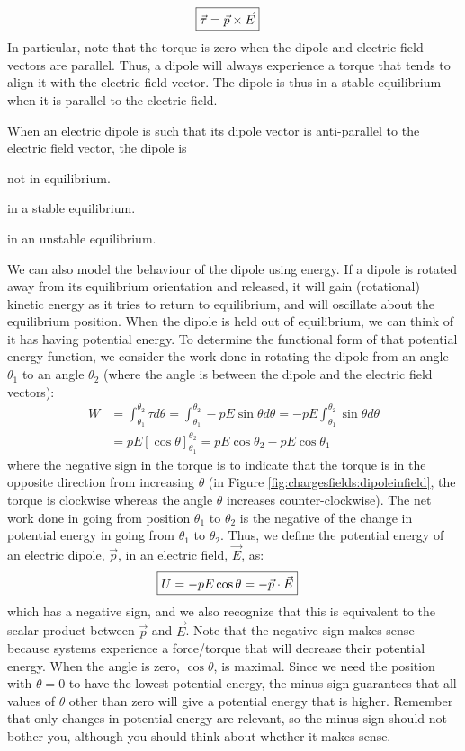 \begin{align*}
\Aboxed{\vec \tau =\vec p \times \vec E}
\end{align*}
In particular, note that the torque is zero when the dipole and electric field vectors are parallel. Thus, a dipole will always experience a torque that tends to align it with the electric field vector. The dipole is thus in a stable equilibrium when it is parallel to the electric field.
\begin{checkpoint}\label{cp:chargesfields:efield}
\begin{MCquestion}{When an electric dipole is such that its dipole vector is anti-parallel to the electric field vector, the dipole is}
\item not in equilibrium.
\item in a stable equilibrium.
\item in an unstable equilibrium. \correct
\end{MCquestion}
\end{checkpoint}

We can also model the behaviour of the dipole using energy. If a dipole is rotated away from its equilibrium orientation and released, it will gain (rotational) kinetic energy as it tries to return to equilibrium, and will oscillate about the equilibrium position. When the dipole is held out of equilibrium, we can think of it has having potential energy. To determine the functional form of that potential energy function, we consider the work done in rotating the dipole from an angle $\theta_1$ to an angle $\theta_2$ (where the angle is between the dipole and the electric field vectors):
\begin{align*}
W&=\int_{\theta_1}^{\theta_2} \tau d\theta=\int_{\theta_1}^{\theta_2} -pE\sin\theta d\theta=-pE\int_{\theta_1}^{\theta_2} \sin\theta d\theta\\
&=pE[\cos\theta]_{\theta_1}^{\theta_2}=pE\cos\theta_2-pE\cos\theta_1
\end{align*}
where the negative sign in the torque is to indicate that the torque is in the opposite direction from increasing $\theta$ (in Figure \ref{fig:chargesfields:dipoleinfield}, the torque is clockwise whereas the angle $\theta$ increases counter-clockwise). The net work done in going from position $\theta_1$ to $\theta_2$ is the negative of the change in potential energy in going from $\theta_1$ to $\theta_2$. Thus, we define the potential energy of an electric dipole, $\vec p$, in an electric field, $\vec E$, as:
\begin{align*}
\Aboxed{U=-pE\cos\theta=-\vec p\cdot \vec E}
\end{align*}
which has a negative sign, and we also recognize that this is equivalent to the scalar product between $\vec p$ and $\vec E$. Note that the negative sign makes sense because systems experience a force/torque that will decrease their potential energy. When the angle is zero, $\cos\theta$, is maximal. Since we need the position with $\theta=0$ to have the lowest potential energy, the minus sign guarantees that all values of $\theta$ other than zero will give a potential energy that is higher. Remember that only changes in potential energy are relevant, so the minus sign should not bother you, although you should think about whether it makes sense.
\newpage
